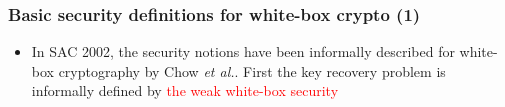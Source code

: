 \documentclass{beamer}
\begin{document}
\frame
{
\frametitle{Basic security definitions for white-box crypto (1)}
\begin{itemize}
\item In SAC 2002, the security notions have  been informally described for white-box cryptography by Chow \textit{et al.}. First the key recovery problem is informally defined by \textcolor{red}{the weak white-box security}
\end{itemize}


\begin{center}
\end{center}
}
\end{document}
